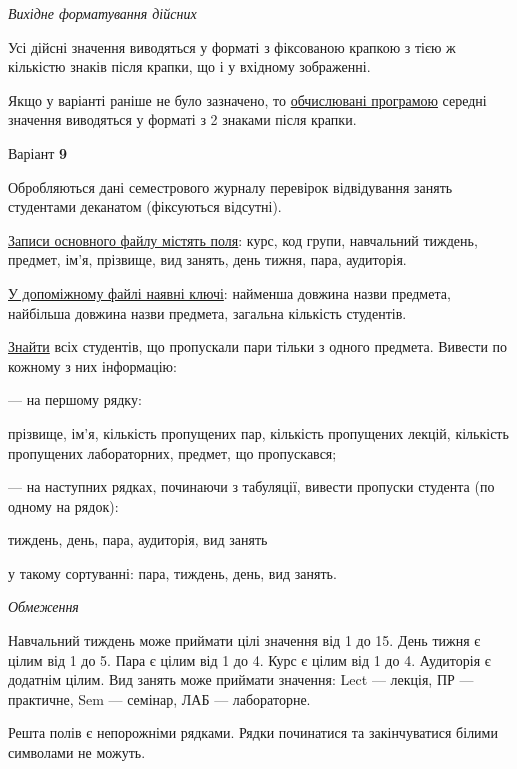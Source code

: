 \documentclass[11pt, ukrainian]{article}
\begin{document}
\textit{Вихідне форматування дійсних}

Усі дійсні значення виводяться у форматі з фіксованою крапкою з тією ж кількістю знаків після крапки, що і у вхідному зображенні.

Якщо у варіанті раніше не було зазначено, то \underline{обчислювані програмою} середні значення виводяться у форматі з 2 знаками після крапки.




\par
\newpage
{\center Варіант  \No \textbf { 9 }\par}
\bigskip
Обробляються дані семестрового журналу перевірок відвідування занять студентами деканатом (фіксуються відсутні). 

\underline{Записи основного файлу містять поля}: курс, код групи, навчальний тиждень, предмет, ім’я, прізвище, вид занять, день тижня, пара, аудиторія.

\underline{У допоміжному файлі наявні ключі}: найменша довжина назви предмета, найбільша довжина назви предмета, загальна кількість студентів.

\underline{Знайти} всіх студентів, що пропускали пари тільки з одного предмета. Вивести по кожному з них інформацію:\par
{\noindent}--- на першому рядку:\par
прізвище, ім’я, кількість пропущених пар, кількість пропущених лекцій, кількість пропущених лабораторних, предмет, що пропускався;

{\noindent}--- на наступних рядках, починаючи з табуляції, вивести пропуски студента (по одному на рядок):\par
тиждень, день, пара, аудиторія, вид занять

{\noindent}у такому сортуванні: пара, тиждень, день, вид занять.


\bigskip\textit{Обмеження}

Навчальний тиждень може приймати цілі значення від 1 до 15.
День тижня є цілим від 1 до 5. Пара є цілим від 1 до 4.
Курс є цілим від 1 до 4. Аудиторія є додатнім цілим.
Вид занять може приймати значення:
Lect --- лекція, ПР --- практичне, Sem --- семінар, ЛАБ --- лабораторне.

Решта полів є непорожніми рядками.
Рядки починатися та закінчуватися білими символами не можуть.
\end{document}
